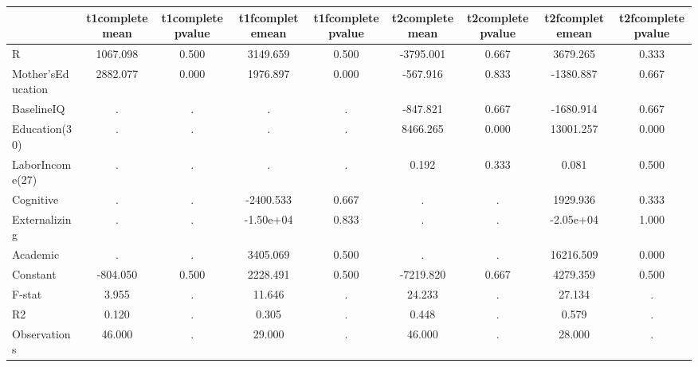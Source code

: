\begin{table}[htbp]
\begin{tabular}{lcccccccc} \hline \hline
 & t1completemean  & t1completepvalue  & t1fcompletemean  & t1fcompletepvalue  & t2completemean  & t2completepvalue  & t2fcompletemean  & t2fcompletepvalue  \\  \hline 
R &  1067.098 &     0.500 &  3149.659 &     0.500 & -3795.001 &     0.667 &  3679.265 &     0.333 \\  
Mother'sEducation &  2882.077 &     0.000 &  1976.897 &     0.000 &  -567.916 &     0.833 & -1380.887 &     0.667 \\  
BaselineIQ &         . &         . &         . &         . &  -847.821 &     0.667 & -1680.914 &     0.667 \\  
Education(30) &         . &         . &         . &         . &  8466.265 &     0.000 & 13001.257 &     0.000 \\  
LaborIncome(27) &         . &         . &         . &         . &     0.192 &     0.333 &     0.081 &     0.500 \\  
Cognitive &         . &         . & -2400.533 &     0.667 &         . &         . &  1929.936 &     0.333 \\  
Externalizing &         . &         . & -1.50e+04 &     0.833 &         . &         . & -2.05e+04 &     1.000 \\  
Academic &         . &         . &  3405.069 &     0.500 &         . &         . & 16216.509 &     0.000 \\  
Constant &  -804.050 &     0.500 &  2228.491 &     0.500 & -7219.820 &     0.667 &  4279.359 &     0.500 \\  
F-stat &     3.955 &         . &    11.646 &         . &    24.233 &         . &    27.134 &         . \\  
R2 &     0.120 &         . &     0.305 &         . &     0.448 &         . &     0.579 &         . \\  
Observations &    46.000 &         . &    29.000 &         . &    46.000 &         . &    28.000 &         . \\  
\hline \hline \end{tabular}
\end{table}
